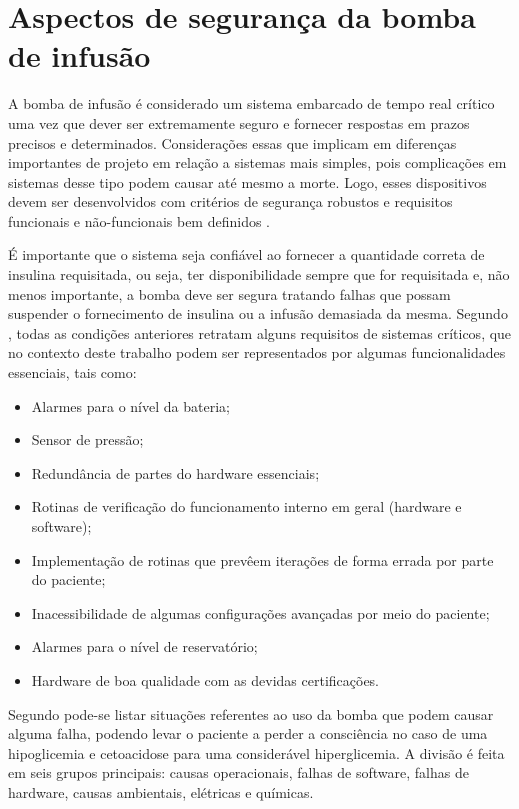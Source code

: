 \section{Aspectos de segurança da bomba de infusão}
A bomba de infusão é considerado um sistema embarcado de tempo real crítico uma vez que dever ser extremamente seguro e fornecer respostas em prazos precisos e determinados. Considerações essas que implicam em diferenças importantes de projeto em relação a sistemas mais simples, pois complicações em sistemas desse tipo podem causar até mesmo a morte. Logo, esses dispositivos devem ser desenvolvidos com critérios de segurança robustos e requisitos funcionais e não-funcionais bem definidos \cite{sommerville2004software}.

É importante que o sistema seja confiável ao fornecer a quantidade correta de insulina requisitada, ou seja, ter disponibilidade sempre que for requisitada e, não menos importante, a bomba deve ser segura tratando falhas que possam suspender o fornecimento de insulina ou a infusão demasiada da mesma. Segundo \cite{sommerville2004software}, todas as condições anteriores retratam alguns requisitos de sistemas críticos, que no contexto deste trabalho podem ser representados por algumas funcionalidades essenciais, tais como:

\begin{itemize}
\item Alarmes para o nível da bateria;
\item Sensor de pressão;
\item Redundância de partes do hardware essenciais;
\item Rotinas de verificação do funcionamento interno em geral (hardware e software);
\item Implementação de rotinas que prevêem iterações de forma errada por parte do paciente;
\item Inacessibilidade de algumas configurações avançadas por meio do paciente;
\item Alarmes para o nível de reservatório;
\item Hardware de boa qualidade com as devidas certificações.
\end{itemize}

Segundo \cite{zhang2010hazard} pode-se listar situações referentes ao uso da bomba que podem causar alguma falha, podendo levar o paciente a perder a consciência no caso de uma hipoglicemia e cetoacidose para uma considerável hiperglicemia. A divisão é feita em seis grupos principais: causas operacionais, falhas de software, falhas de hardware, causas ambientais, elétricas e químicas.

